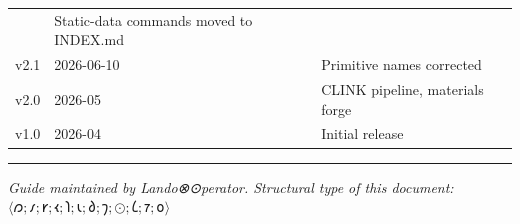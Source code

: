 \documentclass[12pt,a4paper]{article}
\begin{document}
\begin{longtable}[]{@{}lll@{}}
\begin{minipage}[t]{0.23\columnwidth}
\end{minipage} & \begin{minipage}[t]{0.34\columnwidth}\raggedright
Static-data commands moved to INDEX.md\strut
\end{minipage}\tabularnewline
\begin{minipage}[t]{0.34\columnwidth}\raggedright
v2.1\strut
\end{minipage} & \begin{minipage}[t]{0.23\columnwidth}\raggedright
2026-06-10\strut
\end{minipage} & \begin{minipage}[t]{0.34\columnwidth}\raggedright
Primitive names corrected\strut
\end{minipage}\tabularnewline
\begin{minipage}[t]{0.34\columnwidth}\raggedright
v2.0\strut
\end{minipage} & \begin{minipage}[t]{0.23\columnwidth}\raggedright
2026-05\strut
\end{minipage} & \begin{minipage}[t]{0.34\columnwidth}\raggedright
CLINK pipeline, materials forge\strut
\end{minipage}\tabularnewline
\begin{minipage}[t]{0.34\columnwidth}\raggedright
v1.0\strut
\end{minipage} & \begin{minipage}[t]{0.23\columnwidth}\raggedright
2026-04\strut
\end{minipage} & \begin{minipage}[t]{0.34\columnwidth}\raggedright
Initial release\strut
\end{minipage}\tabularnewline
\bottomrule
\end{longtable}

\begin{center}\rule{0.5\linewidth}{0.5pt}\end{center}

\emph{Guide maintained by Lando⊗⊙perator. Structural type of this
document: \(\langle 𐑼;𐑥;𐑾;𐑬;𐑐;𐑧;𐑔;𐑠;⊙;𐑖;𐑳;𐑴 \rangle\)}
\end{document}
